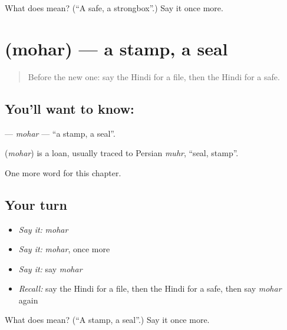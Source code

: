 \begin{tcolorbox}[breakable,colback=teal!4,colframe=teal!35!black,title={Before you move on}]
What does  mean? (\textquotedblleft{}A safe, a strongbox\textquotedblright{}.) Say it once more.
\end{tcolorbox}
\section[\texorpdfstring{\hi{मोहर} (mohar)}{मोहर (mohar)}]{ (mohar) — a stamp, a seal}

\label{lesson:HI-C250-mohar}



\begin{quote}
Before the new one: say the Hindi for a file, then the Hindi for a safe.
\end{quote}

\subsection*{You'll want to know: }
\textbf{} — \emph{mohar} — \textquotedblleft{}a stamp, a seal\textquotedblright{}.

\begin{cousinweb}
\textbf{} (\emph{mohar}) is a loan, usually traced to Persian \emph{muhr}, \textquotedblleft{}seal, stamp\textquotedblright{}.
\end{cousinweb}

\begin{grammarlens}[title={What you've built}]
One more word for this chapter.
\end{grammarlens}

\subsection*{Your turn}
\begin{itemize}
\raggedright
  \item \emph{Say it:} \emph{mohar}
  \item \emph{Say it:} \emph{mohar}, once more
  \item \emph{Say it:} say \emph{mohar}
  \item \emph{Recall:} say the Hindi for a file, then the Hindi for a safe, then say \emph{mohar} again
\end{itemize}

\begin{tcolorbox}[breakable,colback=teal!4,colframe=teal!35!black,title={Before you move on}]
What does  mean? (\textquotedblleft{}A stamp, a seal\textquotedblright{}.) Say it once more.
\end{tcolorbox}
